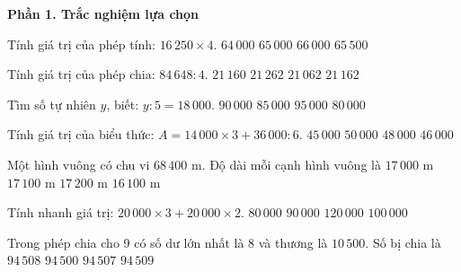 \textbf{Phần 1. Trắc nghiệm lựa chọn}

\begin{ex} %
Tính giá trị của phép tính: $16\,250 \times 4$.
\choice
{$64\,000$}
{\True $65\,000$}
{$66\,000$}
{$65\,500$}
\end{ex}

\begin{ex} %
Tính giá trị của phép chia: $84\,648 : 4$.
\choice
{$21\,160$}
{$21\,262$}
{$21\,062$}
{\True $21\,162$}
\end{ex}

\begin{ex} %
Tìm số tự nhiên $y$, biết: $y : 5 = 18\,000$.
\choice
{\True $90\,000$}
{$85\,000$}
{$95\,000$}
{$80\,000$}
\end{ex}

\begin{ex} %
Tính giá trị của biểu thức: $A = 14\,000 \times 3 + 36\,000 : 6$.
\choice
{$45\,000$}
{$50\,000$}
{\True $48\,000$}
{$46\,000$}
\end{ex}

\begin{ex} %
Một hình vuông có chu vi $68\,400\text{ m}$. Độ dài mỗi cạnh hình vuông là
\choice
{$17\,000\text{ m}$}
{\True $17\,100\text{ m}$}
{$17\,200\text{ m}$}
{$16\,100\text{ m}$}
\end{ex}

\begin{ex} %
Tính nhanh giá trị: $20\,000 \times 3 + 20\,000 \times 2$.
\choice
{$80\,000$}
{$90\,000$}
{$120\,000$}
{\True $100\,000$}
\end{ex}

\begin{ex} %
Trong phép chia cho 9 có số dư lớn nhất là 8 và thương là $10\,500$. Số bị chia là
\choice
{\True $94\,508$}
{$94\,500$}
{$94\,507$}
{$94\,509$}
\end{ex}

